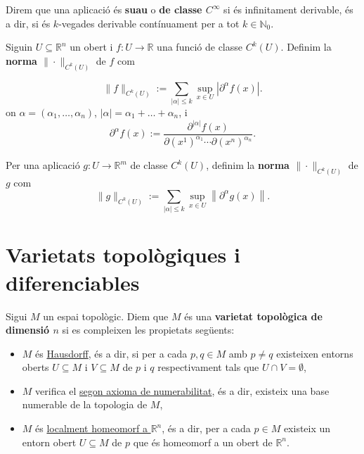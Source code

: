 \begin{defi}
    Direm que una aplicació és \textbf{suau} o \textbf{de classe $C^\infty$} si és infinitament derivable, és a dir, si és $k$-vegades derivable contínuament per a tot $k\in\mathbb N_0$.
\end{defi}

\begin{defi}
    
    Siguin $U\subseteq \mathbb R^n$ un obert i $f:U\to\mathbb R$ una funció de classe $C^k(U)$. Definim la \textbf{norma $\|\cdot\|_{C^k(U)}$} de $f$ com

    \begin{equation*}
        \|f\|_{C^k(U)} := \sum_{|\alpha| \leq k} \sup_{x\in U} \left| \partial^\alpha f(x) \right|.
    \end{equation*}
    on $\alpha = (\alpha_1, \dots, \alpha_n)$, $|\alpha| = \alpha_1 + \dots + \alpha_n$, i
    \[
    \partial^\alpha f(x) := \frac{\partial^{|\alpha|} f(x)}{\partial (x^1)^{\alpha_1}\cdots\partial (x^n)^{\alpha_n}}.
    \]

    Per una aplicació $g:U\to\mathbb{R}^m$ de classe $C^k(U)$, definim la \textbf{norma $\|\cdot\|_{C^k(U)}$} de $g$ com
    \begin{equation*}
        \|g\|_{C^k(U)} := \sum_{|\alpha| \leq k} \sup_{x\in U} \left\| \partial^\alpha g(x) \right\|.
    \end{equation*}    
\end{defi}

\section{Varietats topològiques i diferenciables}
\begin{defi} 
    Sigui $M$ un espai topològic. Diem que $M$ és una \textbf{varietat topològica de dimensió $n$} si es compleixen les propietats següents:
    \begin{itemize}
        \item $M$ és \underline{Hausdorff}, és a dir, si per a cada $p,q\in M$ amb $p\neq q$ existeixen entorns oberts $U\subseteq M$ i $V\subseteq M$ de $p$ i $q$ respectivament tals que $U\cap V = \emptyset$,
        \item $M$ verifica el \underline{segon axioma de numerabilitat}, és a dir, existeix una base numerable de la topologia de $M$,
        \item $M$ és \underline{localment homeomorf a $\mathbb R^n$}, és a dir, per a cada $p\in M$ existeix un entorn obert $U\subseteq M$ de $p$ que és homeomorf a un obert de $\mathbb R^n$.
    \end{itemize}
\end{defi}

